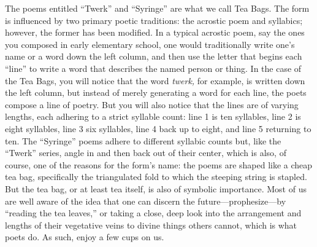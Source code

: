 \begin{justify}
    \noindent{}The poems entitled “Twerk” and
    “Syringe” are what we call Tea Bags.
    The form is influenced by two primary
    poetic traditions: the acrostic poem
    and syllabics; however, the former has
    been modified. In a typical acrostic poem,
    say the ones you composed in early elementary
    school, one would traditionally write one's
    name or a word down the left column, and
    then use the letter that begins each “line”
    to write a word that describes the named
    person or thing. In the case of the Tea Bags,
    you will notice that the word \textit{twerk,} for example,
    is written down the left column, but instead
    of merely generating a word for each line,
    the poets compose a line of poetry. But you
    will also notice that the lines are of
    varying lengths, each adhering to a strict
    syllable count: line 1 is ten syllables,
    line 2 is eight syllables, line 3 six
    syllables, line 4 back up to eight, and line
    5 returning to ten. The “Syringe” poems
    adhere to different syllabic counts but,
    like the “Twerk” series, angle in and then
    back out of their center, which is also, of
    course, one of the reasons for the form's
    name: the poems are shaped like a cheap tea
    bag, specifically the triangulated fold to
    which the steeping string is stapled. But the
    tea bag, or at least tea itself, is also of
    symbolic importance. Most of us are well
    aware of the idea that one can discern the
    future---prophesize---by “reading the tea
    leaves,” or taking a close, deep look into the
    arrangement and lengths of their vegetative
    veins to divine things others cannot, which
    is what poets do. As such, enjoy a few cups
    on us.
    
    \begin{center}
    \end{center}
    

\end{justify}
